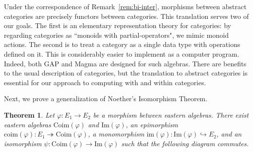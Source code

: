 \documentclass{amsart}
\numberwithin{lstfloat}{section}
\newtheorem{thm}{Theorem}[section]
\theoremstyle{definition}
\theoremstyle{remark}
\numberwithin{equation}{section}
\begin{document}
Under the correspondence of Remark~\ref{rem:bi-inter}, morphisms between
abstract categories are precisely functors between categories. This translation
serves two of our goals.  The first is an elementary representation theory for
categories: by regarding categories as ``monoids with partial-operators", we
mimic monoid actions.  The second is to treat a category as a single data type
with operations defined on it.  This is considerably easier to implement as a
computer program. Indeed, both {\sf GAP} \cite{GAP4} and {\sc Magma}
\cite{magma} are designed for such algebras. There are benefits to the usual
description of categories, but the translation to abstract categories is
essential for our approach to  computing with and within categories.

Next, we prove a generalization of Noether's Isomorphism Theorem.
\enlargethispage{0.3cm}

\begin{thm}
\label{thm:Noether}
  Let $\varphi : E_1 \to E_2$ be a morphism between eastern algebras. There
  exist eastern algebras $\mathrm{Coim}(\varphi)$ and $\mathrm{Im}(\varphi)$, an
  epimorphism $\mathrm{coim}(\varphi) : E_1 \twoheadrightarrow
  \mathrm{Coim}(\varphi)$, a monomorphism $\mathrm{im}(\varphi) :
  \mathrm{Im}(\varphi) \hookrightarrow E_2$, and an isomorphism $\psi :
  \mathrm{Coim}(\varphi) \to \mathrm{Im}(\varphi)$ such that the  
  following diagram commutes.
  \begin{center}
  \end{center}
\end{thm}
\end{document}
